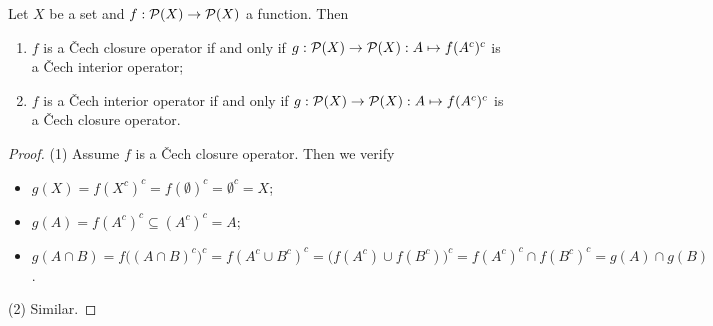 \begin{lemma}
Let $X$ be a set and $f: \operatorname{\mathcal{P}}(X)\to \operatorname{\mathcal{P}}(X)$ a function. Then
\begin{enumerate}
\item $f$ is a Čech closure operator \textup{if and only if} $g: \operatorname{\mathcal{P}}(X)\to \operatorname{\mathcal{P}}(X): A\mapsto f(A^c)^c$ is a Čech interior operator;
\item $f$ is a Čech interior operator \textup{if and only if} $g: \operatorname{\mathcal{P}}(X)\to \operatorname{\mathcal{P}}(X): A\mapsto f(A^c)^c$ is a Čech closure operator.
\end{enumerate}
\end{lemma}
\begin{proof}
(1) Assume $f$ is a Čech closure operator. Then we verify
\begin{itemize}
\item $g(X) = f(X^c)^c = f(\emptyset)^c = \emptyset^c = X$;
\item $g(A) = f(A^c)^c \subseteq (A^c)^c = A$;
\item $g(A\cap B) = f\big((A\cap B)^c\big)^c = f(A^c\cup B^c)^c = \big(f(A^c) \cup f(B^c)\big)^c = f(A^c)^c \cap f(B^c)^c = g(A) \cap g(B)$. 
\end{itemize}
(2) Similar.
\end{proof}

